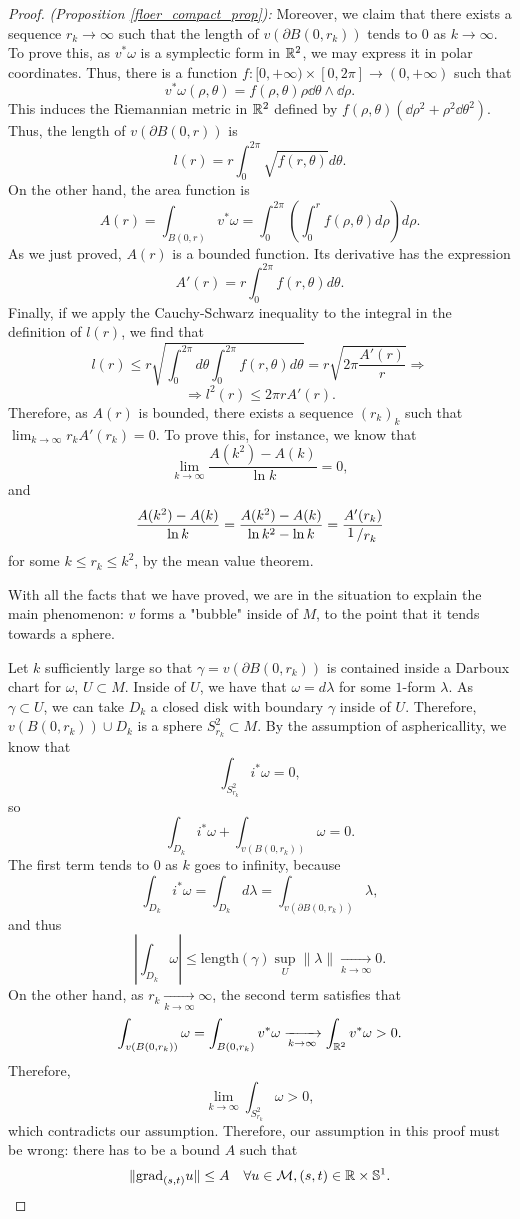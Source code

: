 \begin{proof} {\it (Proposition \ref{floer_compact_prop}):}
Moreover, we claim that there exists a sequence $r_k \rightarrow \infty$ such that the length of $v(\partial B(0,r_k))$ tends to $0$ as $k \rightarrow \infty$. To prove this, as $v^{\ast} \omega$ is a symplectic form in $\mathbb{R}^2$, we may express it in polar coordinates. Thus, there is a function $f : [0,+\infty) \times [0,2\pi] \rightarrow (0,+\infty)$ such that
\[v^{\ast} \omega(\rho,\theta) = f(\rho,\theta) \rho \dd \theta \wedge \dd \rho .\]
This induces the Riemannian metric in $\mathbb{R}^2$ defined by $f(\rho,\theta)(\dd\rho^2 + \rho^2 \dd\theta^2)$. Thus, the length of $v(\partial B(0,r))$ is
\[l(r) = r \int_0^{2\pi} \sqrt{f(r,\theta)} d \theta .\]
On the other hand, the area function is
\[A(r) = \int_{B(0,r)} v^{\ast} \omega = \int_0^{2\pi} \left( \int_0^r f(\rho,\theta) d\rho \right) d\rho .\]
As we just proved, $A(r)$ is a bounded function. Its derivative has the expression
\[A'(r) = r \int_0^{2\pi} f(r,\theta) d\theta .\]
Finally, if we apply the Cauchy-Schwarz inequality to the integral in the definition of $l(r)$, we find that
\[l(r) \leq r \sqrt{\int_0^{2\pi} d\theta \int_0^{2\pi} f(r,\theta) d\theta} = r \sqrt{2\pi \frac{A'(r)}{r}}  \Rightarrow\]
\[\Rightarrow l^2(r) \leq 2\pi r A'(r) .\]
Therefore, as $A(r)$ is bounded, there exists a sequence $(r_k)_k$ such that $\displaystyle\lim_{k\rightarrow \infty} r_k A'(r_k) = 0$. To prove this, for instance, we know that
\[\lim_{k \rightarrow \infty} \frac{A(k^2) - A(k)}{\ln k} = 0 ,\]
and
\[\frac{A(k^2)-A(k)}{\ln k} = \frac{A(k^2)-A(k)}{\ln k^2 - \ln k} = \frac{A'(r_k)}{\quocient{1}{r_k}}\]
for some $k \leq r_k \leq k^2$, by the mean value theorem.

With all the facts that we have proved, we are in the situation to explain the main phenomenon: $v$ forms a "bubble" inside of $M$, to the point that it tends towards a sphere.

Let $k$ sufficiently large so that $\gamma = v(\partial B(0,r_k))$ is contained inside a Darboux chart for $\omega$, $U \subset M$. Inside of $U$, we have that $\omega = d\lambda$ for some $1$-form $\lambda$. As $\gamma \subset U$, we can take $D_k$ a closed disk with boundary $\gamma$ inside of $U$. Therefore, $v(B(0,r_k)) \cup D_k$ is a sphere $S_{r_k}^2 \subset M$. By the assumption of asphericallity, we know that
\[\int_{S_{r_k}^2} i^{\ast} \omega = 0 ,\]
so
\[\int_{D_k} i^{\ast} \omega + \int_{v(B(0,r_k))} \omega = 0 .\]
The first term tends to $0$ as $k$ goes to infinity, because
\[\int_{D_k} i^{\ast} \omega = \int_{D_k} d\lambda = \int_{v(\partial B(0,r_k))} \lambda ,\]
and thus
\[\left| \int_{D_k} \omega \right| \leq \text{length}(\gamma) \sup_U\|\lambda\| \xrightarrow[k \rightarrow \infty]{} 0 .\]
On the other hand, as $r_k \xrightarrow[k \rightarrow \infty]{} \infty$, the second term satisfies that
\[\int_{v(B(0,r_k))} \omega = \int_{B(0,r_k)} v^{\ast} \omega \xrightarrow[k \rightarrow \infty]{} \int_{\mathbb{R}^2} v^{\ast} \omega > 0 .\]
Therefore,
\[\lim_{k \rightarrow \infty} \int_{S_{r_k}^2} \omega > 0,\]
which contradicts our assumption. Therefore, our assumption in this proof must be wrong: there has to be a bound $A$ such that
\[\|\grad_{(s,t)}u\| \leq A \ \ \ \forall u \in \mathcal{M}, (s,t) \in \R \times \con{S}^1 .\]
\end{proof}
